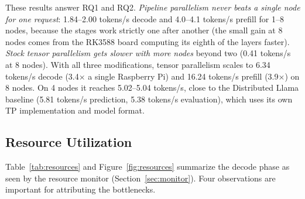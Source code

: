 \documentclass[11pt,a4paper]{article}
\begin{document}
These results answer RQ1 and RQ2. \emph{Pipeline parallelism never beats a single node for one request}: 1.84--2.00 tokens/s decode and 4.0--4.1 tokens/s prefill for 1--8 nodes, because the stages work strictly one after another (the small gain at 8 nodes comes from the RK3588 board computing its eighth of the layers faster). \emph{Stock tensor parallelism gets slower with more nodes} beyond two (0.41 tokens/s at 8 nodes). With all three modifications, tensor parallelism scales to 6.34 tokens/s decode (3.4$\times$ a single Raspberry Pi) and 16.24 tokens/s prefill (3.9$\times$) on 8 nodes. On 4 nodes it reaches 5.02--5.04 tokens/s, close to the Distributed Llama baseline (5.81 tokens/s prediction, 5.38 tokens/s evaluation), which uses its own TP implementation and model format.

\subsection{Resource Utilization}\label{sec:n8_5}

Table~\ref{tab:resources} and Figure~\ref{fig:resources} summarize the decode phase as seen by the resource monitor (Section~\ref{sec:monitor}). Four observations are important for attributing the bottlenecks.

\begin{table}[H]
\centering
\caption{Resource utilization in the decode phase (resource monitor, averages over the measured decode runs). CPU busy = 1 $-$ (idle + I/O wait). Memory is the resident memory of the RPC server (and of the benchmark process on the head). Network values are per worker Raspberry Pi (received + sent).}
\label{tab:resources}
\end{table}
\end{document}
